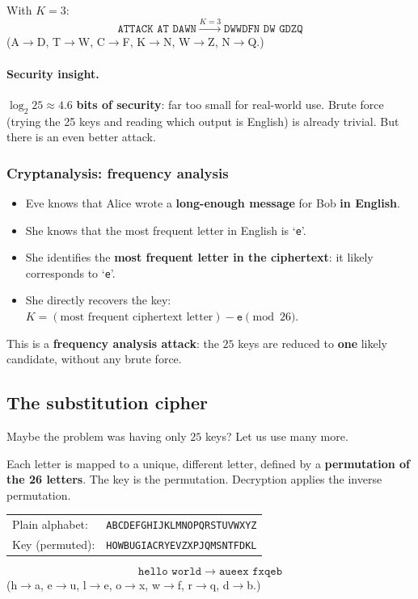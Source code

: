 \begin{example}
With $K = 3$:
\[
\texttt{ATTACK AT DAWN} \;\xrightarrow{K=3}\; \texttt{DWWDFN DW GDZQ}
\]
(A$\to$D, T$\to$W, C$\to$F, K$\to$N, W$\to$Z, N$\to$Q.)
\end{example}

\paragraph{Security insight.} $\log_2 25 \approx \mathbf{4.6}$ \textbf{bits of security}: far too small for real-world use. Brute force (trying the 25 keys and reading which output is English) is already trivial. But there is an even better attack.

\subsubsection{Cryptanalysis: frequency analysis}

\begin{itemize}
    \item Eve knows that Alice wrote a \textbf{long-enough message} for Bob \textbf{in English}.
    \item She knows that the most frequent letter in English is `\texttt{e}'.
    \item She identifies the \textbf{most frequent letter in the ciphertext}: it likely corresponds to `\texttt{e}'.
    \item She directly recovers the key: $K = (\text{most frequent ciphertext letter}) - \texttt{e} \pmod{26}$.
\end{itemize}

This is a \textbf{frequency analysis attack}: the $25$ keys are reduced to \textbf{one} likely candidate, without any brute force.

\subsection{The substitution cipher}

Maybe the problem was having only $25$ keys? Let us use many more.

\begin{definition}
Each letter is mapped to a unique, different letter, defined by a \textbf{permutation of the 26 letters}. The key is the permutation. Decryption applies the inverse permutation.
\end{definition}

\begin{example}
\begin{center}
\begin{tabular}{@{}ll@{}}
Plain alphabet: & \texttt{ABCDEFGHIJKLMNOPQRSTUVWXYZ} \\
Key (permuted): & \texttt{HOWBUGIACRYEVZXPJQMSNTFDKL}
\end{tabular}
\end{center}
\[
\texttt{hello world} \;\longrightarrow\; \texttt{aueex fxqeb}
\]
(h$\to$a, e$\to$u, l$\to$e, o$\to$x, w$\to$f, r$\to$q, d$\to$b.)
\end{example}

